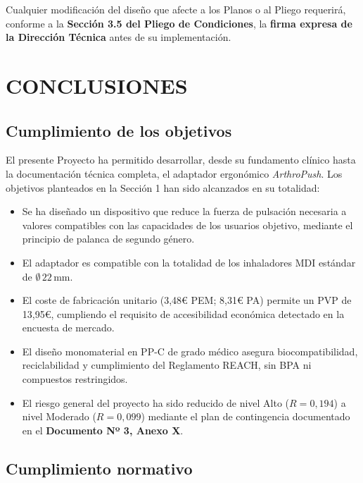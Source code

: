 \documentclass[11pt,a4paper]{article}
\begin{document}
Cualquier modificación del diseño que afecte a los Planos o al Pliego requerirá, conforme a la \textbf{Sección 3.5 del Pliego de Condiciones}, la \textbf{firma expresa de la Dirección Técnica} antes de su implementación.


\section{CONCLUSIONES}

\subsection{Cumplimiento de los objetivos}

El presente Proyecto ha permitido desarrollar, desde su fundamento clínico hasta la documentación técnica completa, el adaptador ergonómico \textit{ArthroPush}. Los objetivos planteados en la Sección 1 han sido alcanzados en su totalidad:

\begin{itemize}
    \item Se ha diseñado un dispositivo que reduce la fuerza de pulsación necesaria a valores compatibles con las capacidades de los usuarios objetivo, mediante el principio de palanca de segundo género.
    \item El adaptador es compatible con la totalidad de los inhaladores MDI estándar de $\emptyset\,22\,\text{mm}$.
    \item El coste de fabricación unitario (3,48€ PEM; 8,31€ PA) permite un PVP de 13,95€, cumpliendo el requisito de accesibilidad económica detectado en la encuesta de mercado.
    \item El diseño monomaterial en PP-C de grado médico asegura biocompatibilidad, reciclabilidad y cumplimiento del Reglamento REACH, sin BPA ni compuestos restringidos.
    \item El riesgo general del proyecto ha sido reducido de nivel Alto ($R = 0{,}194$) a nivel Moderado ($R = 0{,}099$) mediante el plan de contingencia documentado en el \textbf{Documento Nº 3, Anexo X}.
\end{itemize}

\subsection{Cumplimiento normativo}
\end{document}
